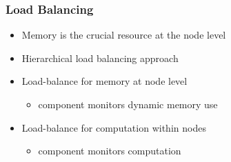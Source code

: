 \begin{frame}[fragile] \frametitle{Load Balancing}
\begin{itemize}
\item Memory is the crucial resource at the node level
\item Hierarchical load balancing approach
\item Load-balance for memory at node level
\begin{itemize}
\item {} component monitors dynamic memory use
\end{itemize}
\item Load-balance for computation within nodes
\begin{itemize}
\item {} component monitors computation
\end{itemize}
\end{itemize}
\end{frame}
